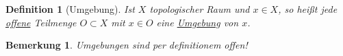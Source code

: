 \documentclass[a4paper,11pt,notitlepage]{report}
\newtheorem{definition}{Definition}[chapter]
\newtheorem{remark}{Bemerkung}[chapter]
\begin{document}
\begin{definition}[Umgebung]
	Ist $X$ topologischer Raum und $x \in X$, so heißt jede \underline{offene} Teilmenge $O \subset X$ mit $x \in O$ eine \underline{Umgebung} von $x$.
\end{definition}

\begin{remark}
	Umgebungen sind per definitionem offen! \newline
	\begin{figure}[h]
		\centering
		 $\qquad\qquad$ 				 
	\end{figure}
\end{remark}
\end{document}
